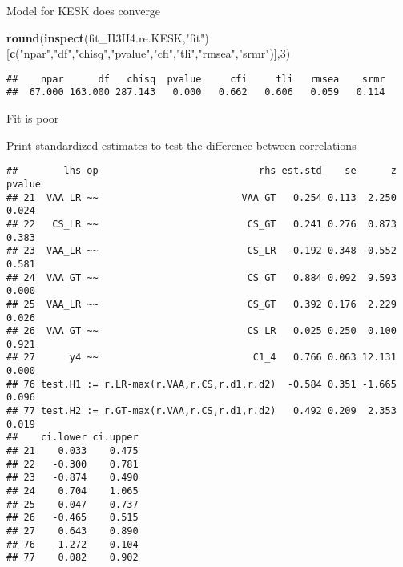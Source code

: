 \documentclass[
]{article}
\newenvironment{Shaded}{\begin{snugshade}}{\end{snugshade}}
\newcommand{\DecValTok}[1]{\textcolor[rgb]{0.00,0.00,0.81}{#1}}
\newcommand{\KeywordTok}[1]{\textcolor[rgb]{0.13,0.29,0.53}{\textbf{#1}}}
\newcommand{\NormalTok}[1]{#1}
\newcommand{\OperatorTok}[1]{\textcolor[rgb]{0.81,0.36,0.00}{\textbf{#1}}}
\newcommand{\StringTok}[1]{\textcolor[rgb]{0.31,0.60,0.02}{#1}}
\begin{document}
Model for KESK does converge

\begin{Shaded}
\begin{Highlighting}[]
\KeywordTok{round}\NormalTok{(}\KeywordTok{inspect}\NormalTok{(fit_H3H4.re.KESK,}\StringTok{"fit"}\NormalTok{)}
\NormalTok{      [}\KeywordTok{c}\NormalTok{(}\StringTok{"npar"}\NormalTok{,}\StringTok{"df"}\NormalTok{,}\StringTok{"chisq"}\NormalTok{,}\StringTok{"pvalue"}\NormalTok{,}\StringTok{"cfi"}\NormalTok{,}\StringTok{"tli"}\NormalTok{,}\StringTok{"rmsea"}\NormalTok{,}\StringTok{"srmr"}\NormalTok{)],}\DecValTok{3}\NormalTok{)}
\end{Highlighting}
\end{Shaded}

\begin{verbatim}
##    npar      df   chisq  pvalue     cfi     tli   rmsea    srmr 
##  67.000 163.000 287.143   0.000   0.662   0.606   0.059   0.114
\end{verbatim}

Fit is poor

Print standardized estimates to test the difference between correlations

\begin{Shaded}
\end{Shaded}

\begin{verbatim}
##        lhs op                            rhs est.std    se      z pvalue
## 21  VAA_LR ~~                         VAA_GT   0.254 0.113  2.250  0.024
## 22   CS_LR ~~                          CS_GT   0.241 0.276  0.873  0.383
## 23  VAA_LR ~~                          CS_LR  -0.192 0.348 -0.552  0.581
## 24  VAA_GT ~~                          CS_GT   0.884 0.092  9.593  0.000
## 25  VAA_LR ~~                          CS_GT   0.392 0.176  2.229  0.026
## 26  VAA_GT ~~                          CS_LR   0.025 0.250  0.100  0.921
## 27      y4 ~~                           C1_4   0.766 0.063 12.131  0.000
## 76 test.H1 := r.LR-max(r.VAA,r.CS,r.d1,r.d2)  -0.584 0.351 -1.665  0.096
## 77 test.H2 := r.GT-max(r.VAA,r.CS,r.d1,r.d2)   0.492 0.209  2.353  0.019
##    ci.lower ci.upper
## 21    0.033    0.475
## 22   -0.300    0.781
## 23   -0.874    0.490
## 24    0.704    1.065
## 25    0.047    0.737
## 26   -0.465    0.515
## 27    0.643    0.890
## 76   -1.272    0.104
## 77    0.082    0.902
\end{verbatim}
\end{document}

